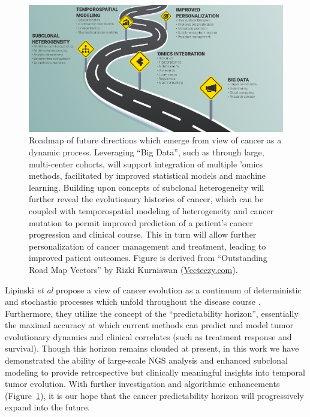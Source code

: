 \begin{figure}
    \centering
    \includegraphics[width=\textwidth,keepaspectratio]{images/conclusion/future_roadmap}
    \caption[Roadmap of future directions.]{Roadmap of future directions which emerge from view of cancer as a dynamic process. Leveraging ``Big Data'', such as through large, multi-center cohorts, will support integration of multiple 'omics methods, facilitated by improved statistical models and machine learning. Building upon concepts of subclonal heterogeneity will further reveal the evolutionary histories of cancer, which can be coupled with temporospatial modeling of heterogeneity and cancer mutation to permit improved prediction of a patient's cancer progression and clinical course. This in turn will allow further personalization of cancer management and treatment, leading to improved patient outcomes. Figure is derived from ``Outstanding Road Map Vectors'' by Rizki Kurniawan (\href{https://www.vecteezy.com/vector-art/211642-outstanding-road-map-vectors}{Vecteezy.com}).}
    \label{fig:conclusions:future_roadmap}
\end{figure}
Lipinski \textit{et al} propose a view of cancer evolution as a continuum of deterministic and stochastic processes which unfold throughout the disease course \cite{lipinski2016}. Furthermore, they utilize the concept of the ``predictability horizon'', essentially the maximal accuracy at which current methods can predict and model tumor evolutionary dynamics and clinical correlates (such as treatment response and survival). Though this horizon remains clouded at present, in this work we have demonstrated the ability of large-scale NGS analysis and enhanced subclonal modeling to provide retrospective but clinically meaningful insights into temporal tumor evolution. With further investigation and algorithmic enhancements (Figure~\ref{fig:conclusions:future_roadmap}), it is our hope that the cancer predictability horizon will progressively expand into the future.


